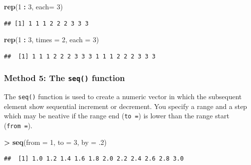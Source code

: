\documentclass[]{book}
\newenvironment{Shaded}{\begin{snugshade}}{\end{snugshade}}
\newcommand{\DataTypeTok}[1]{\textcolor[rgb]{0.13,0.29,0.53}{#1}}
\newcommand{\DecValTok}[1]{\textcolor[rgb]{0.00,0.00,0.81}{#1}}
\newcommand{\FloatTok}[1]{\textcolor[rgb]{0.00,0.00,0.81}{#1}}
\newcommand{\KeywordTok}[1]{\textcolor[rgb]{0.13,0.29,0.53}{\textbf{#1}}}
\newcommand{\NormalTok}[1]{#1}
\newcommand{\OperatorTok}[1]{\textcolor[rgb]{0.81,0.36,0.00}{\textbf{#1}}}
\newcommand{\StringTok}[1]{\textcolor[rgb]{0.31,0.60,0.02}{#1}}
\begin{document}
\begin{Shaded}
\begin{Highlighting}[]
\KeywordTok{rep}\NormalTok{(}\DecValTok{1} \OperatorTok{:}\StringTok{ }\DecValTok{3}\NormalTok{, }\DataTypeTok{each=} \DecValTok{3}\NormalTok{)}
\end{Highlighting}
\end{Shaded}

\begin{verbatim}
## [1] 1 1 1 2 2 2 3 3 3
\end{verbatim}

\begin{Shaded}
\begin{Highlighting}[]
\KeywordTok{rep}\NormalTok{(}\DecValTok{1} \OperatorTok{:}\StringTok{ }\DecValTok{3}\NormalTok{, }\DataTypeTok{times =} \DecValTok{2}\NormalTok{, }\DataTypeTok{each =} \DecValTok{3}\NormalTok{)}
\end{Highlighting}
\end{Shaded}

\begin{verbatim}
##  [1] 1 1 1 2 2 2 3 3 3 1 1 1 2 2 2 3 3 3
\end{verbatim}

\hypertarget{method-5-the-seq-function}{%
\subsubsection*{\texorpdfstring{Method 5: The \texttt{seq()} function}{Method 5: The seq() function}}\label{method-5-the-seq-function}}

The \texttt{seq()} function is used to create a numeric vector in which the subsequent element show sequential increment or decrement. You specify a range and a step which may be neative if the range end (\texttt{to\ =}) is lower than the range start (\texttt{from\ =}).

\begin{Shaded}
\begin{Highlighting}[]
\OperatorTok{>}\StringTok{ }\KeywordTok{seq}\NormalTok{(}\DataTypeTok{from =} \DecValTok{1}\NormalTok{, }\DataTypeTok{to =} \DecValTok{3}\NormalTok{, }\DataTypeTok{by =} \FloatTok{.2}\NormalTok{)}
\end{Highlighting}
\end{Shaded}

\begin{verbatim}
##  [1] 1.0 1.2 1.4 1.6 1.8 2.0 2.2 2.4 2.6 2.8 3.0
\end{verbatim}
\end{document}
